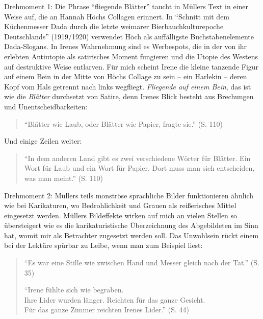 \documentclass[fontsize=12pt]{scrartcl}
\begin{document}
Drehmoment 1: Die Phrase "`fliegende Bl\"atter"' taucht in M\"ullers Text in einer Weise auf, die an Hannah H\"ochs Collagen erinnert. In "`Schnitt mit dem K\"uchenmesser Dada durch die letzte weimarer Bierbauchkulturepoche Deutschlands"' (1919/1920) ver\-wen\-det H\"och als auff\"alligste Buchstabenelemente Dada-Slogans. In Irenes Wahr\-neh\-mung sind es Wer\-be\-spots, die in der von ihr erlebten Antiutopie als satirisches Moment fungieren und die Utopie des Westens auf destruktive Weise entlarven. F\"ur mich scheint Irene die kleine tanzende Figur auf einem Bein in der Mitte von H\"ochs Collage zu sein -- ein Harlekin\textsuperscript{\tiny *} -- deren Kopf vom Hals getrennt nach links wegfliegt. \textit{Fliegende auf einem Bein}, das ist wie die \textit{Bl\"atter} durchsetzt von Satire, denn Irenes Blick be\-steht aus Brechungen und Unentscheidbarkei\-ten: 

\singlespacing
\begin{quote}
"`Bl\"atter wie Laub, oder Bl\"atter wie Papier, fragte sie."' (S. 110)
\end{quote}
\onehalfspacing 

Und einige Zeilen weiter: 

\singlespacing
\begin{quote}
"`In dem anderen Land gibt es zwei verschiedene W\"orter f\"ur Bl\"atter. Ein Wort f\"ur Laub und ein Wort f\"ur Papier. Dort muss man sich entscheiden, was man meint."' (S. 110)
\end{quote}
\onehalfspacing 

Drehmoment 2: M\"ullers teils monstr\"ose sprachliche Bilder funktionieren \"ahnlich wie bei Karikaturen, wo Bedrohlichkeit und Grauen als rei{\ss}erisches Mittel eingesetzt werden. M\"ullers Bildeffekte wirken auf mich an vielen Stellen so \"ubersteigert wie es die karikaturistische \"Uberzeichnung des Abgebildeten im Sinn hat, womit mir als Betrachter\textsuperscript{\tiny *} zugesetzt werden soll. Das Unwohlsein r\"uckt einem bei der Lekt\"ure sp\"urbar zu Leibe, wenn man zum Beispiel liest: 

\singlespacing
\begin{quote}
"`Es war eine Stille wie zwischen Hand und Messer gleich nach der Tat."' (S. 35) 

"`Irene f\"uhlte sich wie begraben.\\
Ihre Lider wurden l\"anger. Reichten f\"ur das ganze Gesicht.\\
F\"ur das ganze Zimmer reichten Irenes Lider."' (S. 44) 
\end{quote}
\onehalfspacing
\end{document}
